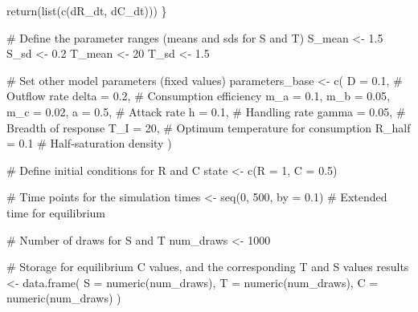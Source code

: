 \documentclass[
  letterpaper,
  DIV=11,
  numbers=noendperiod]{scrartcl}
\newenvironment{Shaded}{\begin{snugshade}}{\end{snugshade}}
\newcommand{\AttributeTok}[1]{\textcolor[rgb]{0.40,0.45,0.13}{#1}}
\newcommand{\CommentTok}[1]{\textcolor[rgb]{0.37,0.37,0.37}{#1}}
\newcommand{\DecValTok}[1]{\textcolor[rgb]{0.68,0.00,0.00}{#1}}
\newcommand{\FloatTok}[1]{\textcolor[rgb]{0.68,0.00,0.00}{#1}}
\newcommand{\FunctionTok}[1]{\textcolor[rgb]{0.28,0.35,0.67}{#1}}
\newcommand{\NormalTok}[1]{\textcolor[rgb]{0.00,0.23,0.31}{#1}}
\newcommand{\OtherTok}[1]{\textcolor[rgb]{0.00,0.23,0.31}{#1}}
\begin{document}
\begin{Shaded}
\begin{Highlighting}[]
    \FunctionTok{return}\NormalTok{(}\FunctionTok{list}\NormalTok{(}\FunctionTok{c}\NormalTok{(dR\_dt, dC\_dt)))}
\NormalTok{\}}

\CommentTok{\# Define the parameter ranges (means and sds for S and T)}
\NormalTok{S\_mean }\OtherTok{\textless{}{-}} \FloatTok{1.5}
\NormalTok{S\_sd }\OtherTok{\textless{}{-}} \FloatTok{0.2}
\NormalTok{T\_mean }\OtherTok{\textless{}{-}} \DecValTok{20}
\NormalTok{T\_sd }\OtherTok{\textless{}{-}} \FloatTok{1.5}

\CommentTok{\# Set other model parameters (fixed values)}
\NormalTok{parameters\_base }\OtherTok{\textless{}{-}} \FunctionTok{c}\NormalTok{(}
    \AttributeTok{D =} \FloatTok{0.1}\NormalTok{, }\CommentTok{\# Outflow rate}
    \AttributeTok{delta =} \FloatTok{0.2}\NormalTok{, }\CommentTok{\# Consumption efficiency}
    \AttributeTok{m\_a =} \FloatTok{0.1}\NormalTok{,}
    \AttributeTok{m\_b =} \FloatTok{0.05}\NormalTok{,}
    \AttributeTok{m\_c =} \FloatTok{0.02}\NormalTok{,}
    \AttributeTok{a =} \FloatTok{0.5}\NormalTok{, }\CommentTok{\# Attack rate}
    \AttributeTok{h =} \FloatTok{0.1}\NormalTok{, }\CommentTok{\# Handling rate}
    \AttributeTok{gamma =} \FloatTok{0.05}\NormalTok{, }\CommentTok{\# Breadth of response}
    \AttributeTok{T\_I =} \DecValTok{20}\NormalTok{, }\CommentTok{\# Optimum temperature for consumption}
    \AttributeTok{R\_half =} \FloatTok{0.1} \CommentTok{\# Half{-}saturation density}
\NormalTok{)}

\CommentTok{\# Define initial conditions for R and C}
\NormalTok{state }\OtherTok{\textless{}{-}} \FunctionTok{c}\NormalTok{(}\AttributeTok{R =} \DecValTok{1}\NormalTok{, }\AttributeTok{C =} \FloatTok{0.5}\NormalTok{)}

\CommentTok{\# Time points for the simulation}
\NormalTok{times }\OtherTok{\textless{}{-}} \FunctionTok{seq}\NormalTok{(}\DecValTok{0}\NormalTok{, }\DecValTok{500}\NormalTok{, }\AttributeTok{by =} \FloatTok{0.1}\NormalTok{) }\CommentTok{\# Extended time for equilibrium}

\CommentTok{\# Number of draws for S and T}
\NormalTok{num\_draws }\OtherTok{\textless{}{-}} \DecValTok{1000}

\CommentTok{\# Storage for equilibrium C values, and the corresponding T and S values}
\NormalTok{results }\OtherTok{\textless{}{-}} \FunctionTok{data.frame}\NormalTok{(}
    \AttributeTok{S =} \FunctionTok{numeric}\NormalTok{(num\_draws),}
    \AttributeTok{T =} \FunctionTok{numeric}\NormalTok{(num\_draws),}
    \AttributeTok{C =} \FunctionTok{numeric}\NormalTok{(num\_draws)}
\NormalTok{)}


\end{Highlighting}
\end{Shaded}
\end{document}
